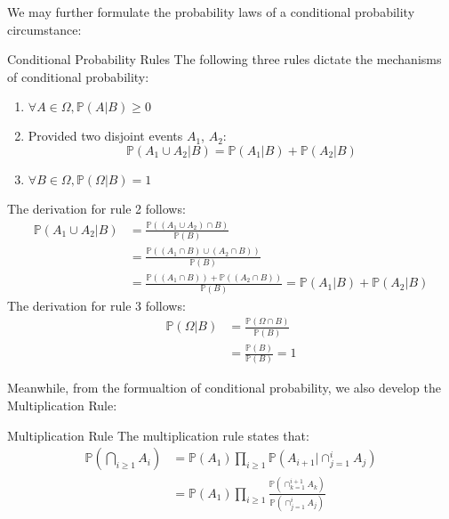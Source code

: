 We may further formulate the probability laws of a conditional probability circumstance:
\begin{ln-theorem}{Conditional Probability Rules}{}
    The following three rules dictate the mechanisms of conditional probability:
    \begin{enumerate}
        \item $\forall A \in \Omega, \mathbb{P} (A | B) \geq 0$
        \item Provided two disjoint events $A_1$, $A_2$: \[\mathbb{P}(A_1 \cup A_2 | B) = \mathbb{P}(A_1 | B) + \mathbb{P}(A_2 | B) \]
        \item $\forall B \in \Omega, \mathbb{P}(\Omega | B) = 1$
    \end{enumerate}
    \tcblower
    The derivation for rule 2 follows:
    \begin{align*}
        \mathbb{P}(A_1 \cup A_2 | B)
        &= \frac{\mathbb{P}((A_1 \cup A_2) \cap B)}{\mathbb{P}(B)} \\
        &= \frac{\mathbb{P}((A_1 \cap B) \cup (A_2 \cap B))}{\mathbb{P}(B)} \\
        &= \frac{\mathbb{P}((A_1 \cap B)) + \mathbb{P}((A_2 \cap B))}{\mathbb{P}(B)}
        = \mathbb{P}(A_1 | B) + \mathbb{P}(A_2 | B)
    \end{align*}
    The derivation for rule 3 follows:
    \begin{align*}
        \mathbb{P}(\Omega | B)
        &= \frac{\mathbb{P}(\Omega \cap B)}{\mathbb{P}(B)} \\
        &= \frac{\mathbb{P}(B)}{\mathbb{P}(B)} = 1
    \end{align*}
\end{ln-theorem}

Meanwhile, from the formualtion of conditional probability, we also develop the Multiplication Rule:
\begin{ln-theorem}{Multiplication Rule}{}
    The multiplication rule states that:
    \begin{align*}
        \mathbb{P}(\bigcap_{i \geq 1} A_i)
        &= \mathbb{P}(A_1) \prod_{i \geq 1} \mathbb{P}(A_{i + 1} | \cap_{j = 1}^i A_{j}) \\
        &= \mathbb{P}(A_1) \prod_{i \geq 1} \frac{\mathbb{P}(\cap_{k = 1}^{i+1} A_k)}{\mathbb{P}(\cap_{j = 1}^{i} A_j)}
    \end{align*}
\end{ln-theorem}

